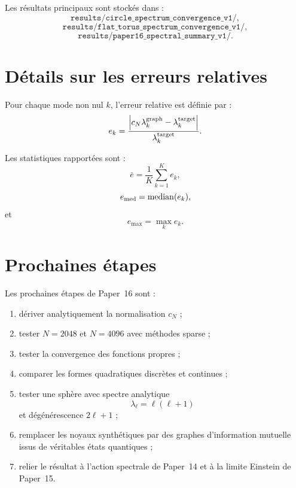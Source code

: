 \documentclass[11pt,a4paper]{article}
\begin{document}
Les résultats principaux sont stockés dans :
\[
\texttt{results/circle\_spectrum\_convergence\_v1/},
\]
\[
\texttt{results/flat\_torus\_spectrum\_convergence\_v1/},
\]
\[
\texttt{results/paper16\_spectral\_summary\_v1/}.
\]

\appendix

\section{Détails sur les erreurs relatives}

Pour chaque mode non nul \(k\), l'erreur relative est définie par :
\[
e_k
=
\frac{
\left|
c_N\lambda_k^{\rm graph}
-
\lambda_k^{\rm target}
\right|
}{
\lambda_k^{\rm target}
}.
\]

Les statistiques rapportées sont :
\[
\bar e
=
\frac{1}{K}
\sum_{k=1}^K e_k,
\]
\[
e_{\rm med}
=
\operatorname{median}(e_k),
\]
et
\[
e_{\max}
=
\max_k e_k.
\]

\section{Prochaines étapes}

Les prochaines étapes de Paper~16 sont :

\begin{enumerate}
    \item dériver analytiquement la normalisation \(c_N\) ;
    \item tester \(N=2048\) et \(N=4096\) avec méthodes sparse ;
    \item tester la convergence des fonctions propres ;
    \item comparer les formes quadratiques discrètes et continues ;
    \item tester une sphère avec spectre analytique
    \[
    \lambda_\ell=\ell(\ell+1)
    \]
    et dégénérescence \(2\ell+1\) ;
    \item remplacer les noyaux synthétiques par des graphes d'information
    mutuelle issus de véritables états quantiques ;
    \item relier le résultat à l'action spectrale de Paper~14 et à la limite
    Einstein de Paper~15.
\end{enumerate}
\end{document}
